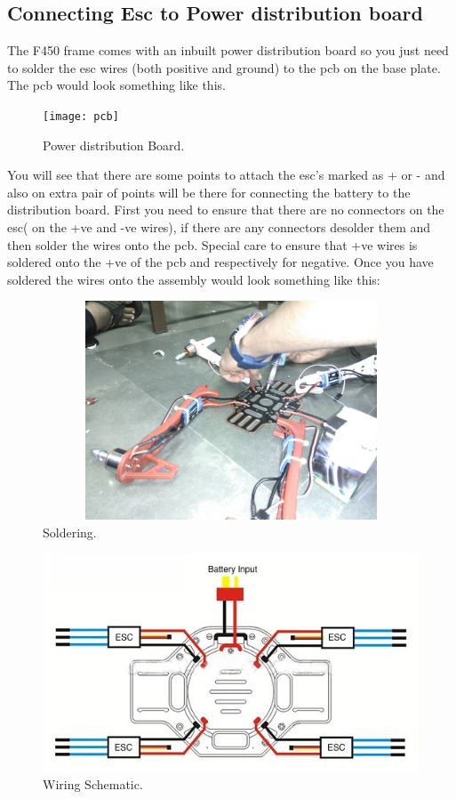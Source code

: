 \documentclass[11pt,a4paper]{article}
\begin{document}
		\subsection{Connecting Esc to Power distribution board}
		The F450 frame comes with an inbuilt power distribution board so you just need to solder the esc wires (both positive and ground) to the pcb on the base plate. The pcb would look something like this.
		\begin{figure}[h]
	 	
	 	\centering
		\texttt{[image: pcb]}
		\caption{Power distribution Board.}
		\end{figure}
		
You will see that there are some points to attach the esc's marked as + or - and also on extra pair of points will be there for connecting the battery to the distribution board. First you need to ensure that there are no connectors on the esc( on the +ve and -ve wires), if there are any connectors desolder them and then solder the wires onto the pcb. Special care to ensure that +ve wires is soldered onto the +ve of the pcb and respectively for negative. Once you have soldered the wires onto the assembly would look something like this:
		\begin{figure}[h]
	 	
	 	\centering
		\includegraphics[width=12cm,height=6.5cm]{solder}
		\caption{Soldering.}
		\end{figure}
		
		\begin{figure}[h]
	 	
	 	\centering
		\includegraphics[width=12cm,height=6.5cm]{wiring}
		\caption{Wiring Schematic.}
		\end{figure}
		
\end{document}
